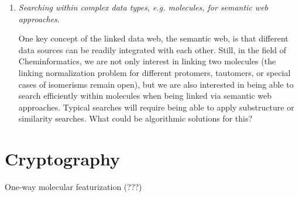 \documentclass{sig-alternate}
\begin{document}
\begin{enumerate}
\item \emph{Searching within complex data types, e.g. molecules, for semantic web approaches}.

One key concept of the linked data web, the semantic web, is that different data sources can be readily integrated with each other. Still, in the field
of Cheminformatics, we are not only interest in linking two molecules 
(the linking normalization problem for different protomers, tautomers, or special cases of isomerisms remain open), but we
are also interested in being able to search efficiently within molecules when being linked via semantic web approaches. Typical
searches will require being able to apply substructure or similarity searches.
What could be algorithmic solutions for this?
\end{enumerate}

\section*{Cryptography}
One-way molecular featurization (???)
\end{document}
